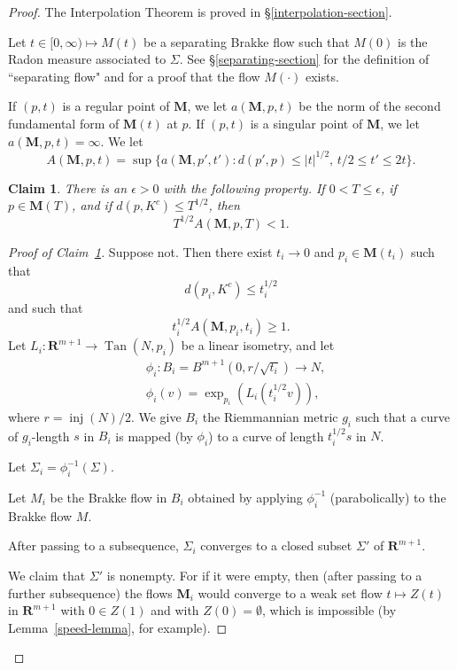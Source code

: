 \documentclass{amsart}
\newcommand{\inj}{\operatorname{inj}}    %
\newcommand{\MMM}{\mathbf M}
\newcommand{\RR}{\mathbf{R}}  %
\newcommand{\eps}{\epsilon}
\newcommand{\Tan}{\operatorname{Tan}}
\newtheorem{claim}{Claim}
\theoremstyle{definition}
\theoremstyle{definition}
\begin{document}
\begin{proof}
The Interpolation Theorem is proved in \S\ref{interpolation-section}.

Let $t\in [0,\infty)\mapsto M(t)$ be a separating Brakke flow such that $M(0)$ is the Radon
measure associated to $\Sigma$.   See \S\ref{separating-section} for the definition of ``separating flow"
and for a proof that the flow $M(\cdot)$ exists.

If $(p,t)$ is a regular point of $\MMM$, we let $a(\MMM,p,t)$ be the norm of the second fundamental 
form of $\MMM(t)$ at $p$.  If $(p,t)$ is a singular point of $\MMM$, we 
let $a(\MMM,p,t)=\infty$.  We let
\[
   A(\MMM,p,t) = \sup\{ a(\MMM,p',t'):  d(p',p)\le |t|^{1/2}, \,  t/2 \le t' \le 2t\}.
\]

\begin{claim}\label{claim-one}
There is an $\eps>0$ with the following property.
If $0<T\le \eps$, if $p\in \MMM(T)$, and if $d(p,K^c)\le T^{1/2}$, then
\[
  T^{1/2}   A(\MMM,p,T) < 1.
\]
\end{claim}

\begin{proof}[Proof of Claim~\ref{claim-one}]
Suppose not.  Then there exist $t_i\to 0$ and $p_i\in \MMM(t_i)$ such that 
\[
   d(p_i, K^c) \le t_i^{1/2}
\]
and such that
\[
  t_i^{1/2} A(\MMM,p_i,t_i) \ge 1.
\]
Let $L_i: \RR^{m+1} \to \Tan(N,p_i)$ be a linear isometry,
and let 
\begin{align*}
&\phi_i:  B_i = B^{m+1}(0, r / \sqrt{t_i}) \to N, \\
&\phi_i(v) = \exp_{p_i} ( L_i (t_i^{1/2} v)),
\end{align*}
where $r=\inj(N)/2$.  We give $B_i$ the Riemmannian metric $g_i$ such  that
a curve of $g_i$-length $s$ in $B_i$ is mapped (by $\phi_i$) to a curve of length $t_i^{1/2}s$ in $N$.


Let $\Sigma_i= \phi_i^{-1}(\Sigma)$.

Let $M_i$ be the Brakke flow in $B_i$ obtained by applying $\phi_i^{-1}$ (parabolically)
 to the Brakke flow $M$.



After passing to a subsequence,  $\Sigma_i$ converges to a closed subset $\Sigma'$ of $\RR^{m+1}$.

We claim that $\Sigma'$ is nonempty.  For if it were empty, then (after passing to a further subsequence)
the flows $\MMM_i$ would converge to a weak set flow $t\mapsto Z(t)$ in $\RR^{m+1}$
with $0\in Z(1)$ and with $Z(0)=\emptyset$, which is impossible (by
  Lemma~\ref{speed-lemma}, for example).
  

\end{proof}
\end{proof}
\end{document}
